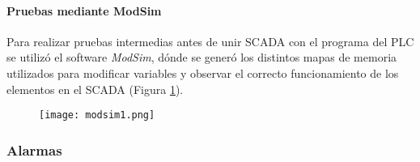 \paragraph{Pruebas mediante ModSim}
Para realizar pruebas intermedias antes de unir SCADA con el programa del PLC se utilizó el software \textit{ModSim}, dónde se generó los distintos mapas de memoria utilizados para modificar variables y observar el correcto funcionamiento de los elementos en el SCADA (Figura \ref{fig:modsim1}).

\begin{figure}[h!]
	\centering
	\texttt{[image: modsim1.png]}
	\label{fig:modsim1}
\end{figure}



\subsubsection{Alarmas}

